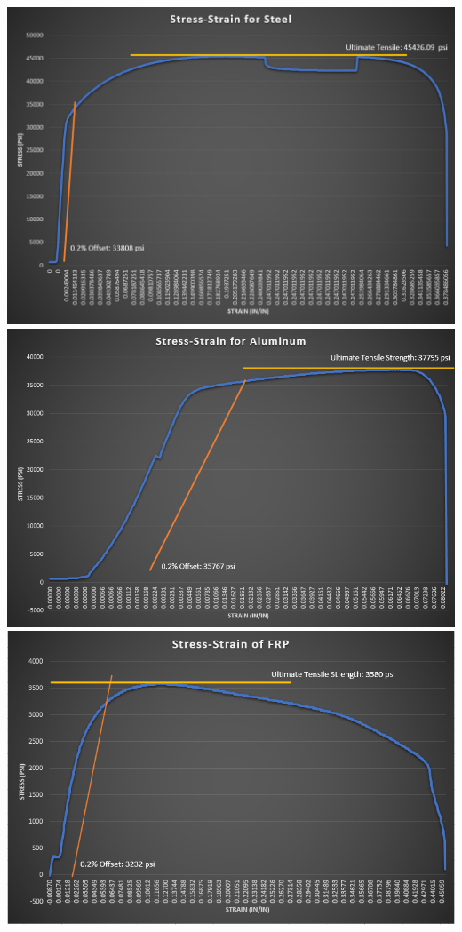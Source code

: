 \documentclass{article}
\begin{document}
\begin{center}
\includegraphics[width=400pt]{SteelGraph.png}
\includegraphics[width=400pt]{AluminumGraph.png}
\includegraphics[width=400pt]{PolymerGraph.png}
\end{center}
\end{document}
